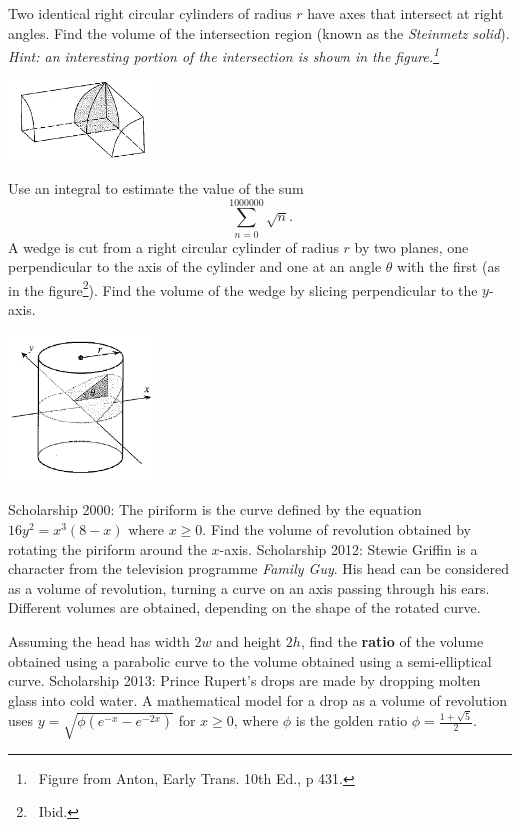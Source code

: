 \begin{questions}
  \clearpage
  \questioO Two identical right circular cylinders of radius $ r $ have axes that intersect at right angles. Find the volume of
            the intersection region (known as the \textit{Steinmetz solid}). \textit{Hint: an interesting portion of the intersection
            is shown in the figure.\footnote{~Figure from Anton, Early Trans. 10th Ed., p 431.}}
            \begin{center}
              \includegraphics[width=0.3\textwidth]{steinmetz}
            \end{center}
  \questioS Use an integral to estimate the value of the sum
            \begin{displaymath}
              \sum_{n = 0}^{1000000} \sqrt{n}.
            \end{displaymath}
  \questioO A wedge is cut from a right circular cylinder of radius $ r $ by two planes, one perpendicular to the axis of the cylinder
            and one at an angle $ \theta $ with the first (as in the figure\footnote{~Ibid.}). Find the volume of the wedge by slicing perpendicular to
            the $ y$-axis.
            \begin{center}
              \includegraphics[width=0.3\textwidth]{wedge}
            \end{center}
  \questioS Scholarship 2000: The piriform is the curve defined by the equation $ 16y^2 = x^3(8-x) $ where $ x \geq 0 $.
            Find the volume of revolution obtained by rotating the piriform around the $ x$-axis.
  \questioO Scholarship 2012: Stewie Griffin is a character from the television programme \textit{Family Guy}. His head can be considered
            as a volume of revolution, turning a curve on an axis passing through his ears. Different volumes are obtained, depending on
            the shape of the rotated curve.

            Assuming the head has width $ 2w $ and height $ 2h $, find the \textbf{ratio} of the volume obtained using a parabolic curve
            to the volume obtained using a semi-elliptical curve.
  \questioS Scholarship 2013: Prince Rupert's drops are made by dropping molten glass into cold water. A mathematical model for a drop
            as a volume of revolution uses $ y = \sqrt{\phi (e^{-x} - e^{-2x})} $ for $ x \geq 0 $, where $ \phi $ is the golden
            ratio $ \phi = \frac{1 + \sqrt{5}}{2} $.
    \begin{parts}

\end{parts}
\end{questions}
